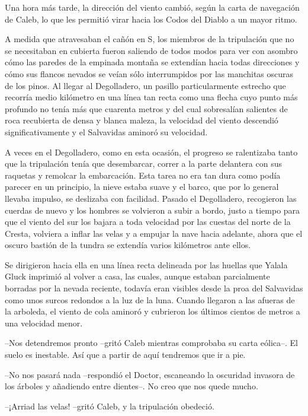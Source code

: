Una hora más tarde, la dirección del viento cambió, según la carta de navegación de Caleb, lo que les permitió virar hacia los Codos del Diablo a un mayor ritmo.
 
A medida que atravesaban el cañón en S, los miembros de la tripulación que no se necesitaban en cubierta fueron saliendo de todos modos para ver con asombro cómo las paredes de la empinada montaña se extendían hacia todas direcciones y cómo sus flancos nevados se veían sólo interrumpidos por las manchitas oscuras de los pinos. Al llegar al Degolladero, un pasillo particularmente estrecho que recorría medio kilómetro en una línea tan recta como una flecha cuyo punto más profundo no tenía más que cuarenta metros y del cual sobresalían salientes de roca recubierta de densa y blanca maleza, la velocidad del viento descendió significativamente y el Salvavidas aminoró su velocidad.
 
A veces en el Degolladero, como en esta ocasión, el progreso se ralentizaba tanto que la tripulación tenía que desembarcar, correr a la parte delantera con sus raquetas y remolcar la embarcación. Esta tarea no era tan dura como podía parecer en un principio, la nieve estaba suave y el barco, que por lo general llevaba impulso, se deslizaba con facilidad. Pasado el Degolladero, recogieron las cuerdas de nuevo y los hombres se volvieron a subir a bordo, justo a tiempo para que el viento del sur los bajara a toda velocidad por las cuestas del norte de la Cresta, volviera a inflar las velas y a empujar la nave hacia adelante, ahora que el oscuro bastión de la tundra se extendía varios kilómetros ante ellos.
 
Se dirigieron hacia ella en una línea recta delineada por las huellas que Yalala Gluck imprimió al volver a casa, las cuales, aunque estaban parcialmente borradas por la nevada reciente, todavía eran visibles desde la proa del Salvavidas como unos surcos redondos a la luz de la luna. Cuando llegaron a las afueras de la arboleda, el viento de cola aminoró y cubrieron los últimos cientos de metros a una velocidad menor.
 
--Nos detendremos pronto --gritó Caleb mientras comprobaba su carta eólica--. El suelo es inestable. Así que a partir de aquí tendremos que ir a pie.
 
--No nos pasará nada --respondió el Doctor, escaneando la oscuridad invasora de los árboles y añadiendo entre dientes--. No creo que nos quede mucho.
 
--¡Arriad las velas! --gritó Caleb, y la tripulación obedeció.
 
